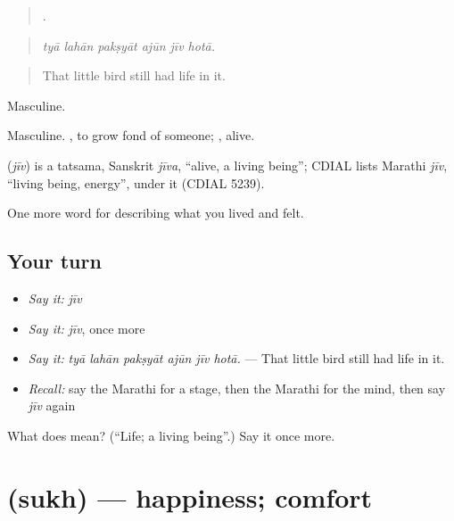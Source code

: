 \begin{quote}
     .
\end{quote}

\begin{quote}
\emph{tyā lahān pakṣyāt ajūn jīv hotā.}
\end{quote}

\begin{quote}
That little bird still had life in it.
\end{quote}

Masculine.

Masculine.  , to grow fond of someone; , alive.

\begin{cousinweb}
\textbf{} (\emph{jīv}) is a tatsama, Sanskrit \emph{jīva}, \textquotedblleft{}alive, a living being\textquotedblright{}; CDIAL lists Marathi \emph{jīv}, \textquotedblleft{}living being, energy\textquotedblright{}, under it (CDIAL 5239).
\end{cousinweb}

\begin{grammarlens}[title={What you've built}]
One more word for describing what you lived and felt.
\end{grammarlens}

\subsection*{Your turn}
\begin{itemize}
\raggedright
  \item \emph{Say it:} \emph{jīv}
  \item \emph{Say it:} \emph{jīv}, once more
  \item \emph{Say it:} \emph{tyā lahān pakṣyāt ajūn jīv hotā.} — That little bird still had life in it.
  \item \emph{Recall:} say the Marathi for a stage, then the Marathi for the mind, then say \emph{jīv} again
\end{itemize}

\begin{tcolorbox}[breakable,colback=teal!4,colframe=teal!35!black,title={Before you move on}]
What does  mean? (\textquotedblleft{}Life; a living being\textquotedblright{}.) Say it once more.
\end{tcolorbox}
\section[\texorpdfstring{\mr{सुख} (sukh)}{सुख (sukh)}]{ (sukh) — happiness; comfort}

